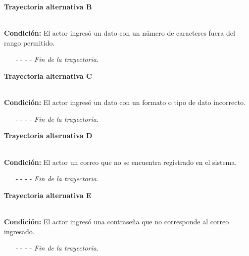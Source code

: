 		\hypertarget{CU1:TAB}{\textbf{Trayectoria alternativa B}}\\
		\noindent \textbf{Condición:} El actor ingresó un dato con un número de caracteres fuera del rango permitido.
		\begin{enumerate}
	\UCpaso[\UCsist] Muestra el  señalando el campo que presenta el error en la pantalla .
	\UCpaso[\UCactor] Regresa al paso \ref{P3} de la Trayectoria Principal.
	\item[- -] - - {\em {Fin de la trayectoria}}.
\end{enumerate}
		\hypertarget{CU1:TAC}{\textbf{Trayectoria alternativa C}}\\
		\noindent \textbf{Condición:} El actor ingresó un dato con un formato o tipo de dato incorrecto.
	\begin{enumerate}
		\UCpaso[\UCsist] Muestra el mensaje  señalando el campo que presenta el error en la pantalla .
		\UCpaso Regresa al paso \ref{P3} de la trayectoria principal.
		\item[- -] - - {\em {Fin de la trayectoria}}.
	\end{enumerate}

		\hypertarget{CU1:TAD}{\textbf{Trayectoria alternativa D}}\\
		\noindent \textbf{Condición:} El actor un correo que no se encuentra registrado en el sistema.
		\begin{enumerate}
	\UCpaso[\UCsist] Muestra el mensaje  en la pantalla  notificando que los datos ingresados son incorrectos.
	\UCpaso[\UCactor] Regresa al paso \ref{P3} de la Trayectoria Principal.
	\item[- -] - - {\em {Fin de la trayectoria}}.
\end{enumerate}

\hypertarget{CU1:TAE}{\textbf{Trayectoria alternativa E}}\\
\noindent \textbf{Condición:} El actor ingresó una contraseña que no corresponde al correo ingresado.
\begin{enumerate}
	\UCpaso[\UCsist] Muestra el mensaje  en la pantalla  notificando que los datos ingresados son incorrectos.
	\UCpaso[\UCactor] Regresa al paso \ref{P3} de la Trayectoria Principal.
	\item[- -] - - {\em {Fin de la trayectoria}}.
\end{enumerate}
	
